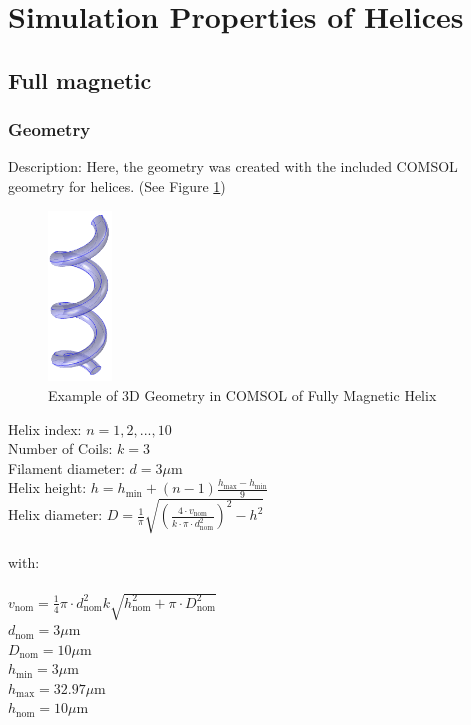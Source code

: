\clearpage

\section{Simulation Properties of Helices}

\subsection{Full magnetic}
\subsubsection{Geometry}

Description: Here, the geometry was created with the included COMSOL geometry for helices. (See Figure \ref{fig:COMSOLfull})

\begin{figure}[ht]
	\centering
  \includegraphics[width=0.15\textwidth]{Pictures/COMSOLfull.png}
	\caption{Example of 3D Geometry in COMSOL of Fully Magnetic Helix}
	\label{fig:COMSOLfull}
\end{figure}


Helix index: $n = 1,2,...,10$\\
Number of Coils: $k = 3$\\
Filament diameter: $d =  3\mu$m\\
Helix height: $h = h_\text{min} + (n -1)\frac{h_\text{max}-h_\text{min}}{9}$\\
Helix diameter: $D = \frac{1}{\pi}\sqrt{\left(\frac{4\cdot v_\text{nom}}{k\cdot \pi \cdot d_\text{nom}^2}\right)^2 - h^2}$\\\\
with:\\\\
$v_\text{nom} = \frac{1}{4}\pi \cdot d_\text{nom}^2 k \sqrt{h_\text{nom}^2+\pi\cdot D_\text{nom}^2} $\\
$d_\text{nom} = 3\mu$m\\
$D_\text{nom} = 10\mu$m\\
$h_\text{min} = 3\mu$m\\
$h_\text{max} = 32.97\mu$m\\
$h_\text{nom} = 10\mu$m

